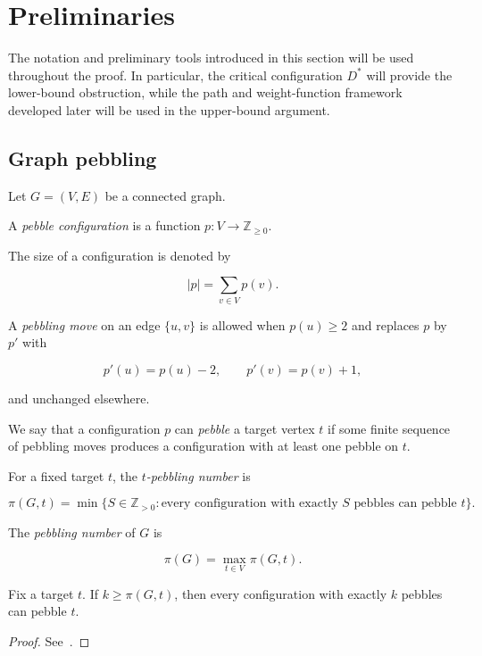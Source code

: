 
\section{Preliminaries}\label{sec:preliminaries}

The notation and preliminary tools introduced in this section will be used
throughout the proof. In particular, the critical configuration $D^*$ will
provide the lower-bound obstruction, while the path and weight-function
framework developed later will be used in the upper-bound argument.

\subsection{Graph pebbling}

Let $G=(V,E)$ be a connected graph.

A \emph{pebble configuration} is a function
$p\colon V\to\mathbb{Z}_{\ge0}$.

The size of a configuration is denoted by

\[
|p|=\sum_{v\in V}p(v).
\]

A \emph{pebbling move} on an edge $\{u,v\}$ is allowed when $p(u)\ge2$
and replaces $p$ by $p'$ with

\[
p'(u)=p(u)-2,\qquad p'(v)=p(v)+1,
\]

and unchanged elsewhere.

We say that a configuration $p$ can \emph{pebble} a target vertex $t$
if some finite sequence of pebbling moves produces a configuration
with at least one pebble on $t$.

For a fixed target $t$, the \emph{$t$-pebbling number} is

\[
\pi(G,t)=
\min\{S\in\mathbb Z_{>0}:
\text{every configuration with exactly $S$ pebbles can pebble $t$}\}.
\]

The \emph{pebbling number} of $G$ is

\[
\pi(G)=\max_{t\in V}\pi(G,t).
\]


\begin{lemma}
\label{lem:mono}

Fix a target $t$. If $k\ge\pi(G,t)$, then every configuration with exactly
$k$ pebbles can pebble $t$.

\end{lemma}


\begin{proof}
See~\cite{Bunde2008,Hurlbert1999}.
\end{proof}


